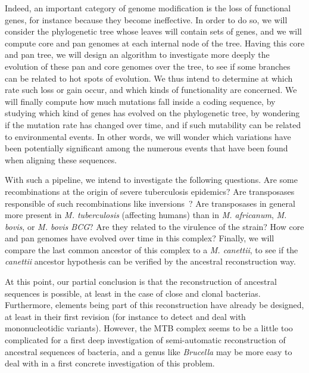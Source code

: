 \documentclass[runningheads,a4paper]{llncs}
\begin{document}
Indeed, an important category of genome modification is the loss of functional genes, for instance because they become ineffective. In order to do so, we will consider the phylogenetic tree whose leaves will contain sets of genes, and we will compute core and pan genomes at each internal node of the tree. Having this core and pan tree, we will design an algorithm to investigate more deeply the evolution of these pan and core genomes over the tree, to see if some branches can be related to hot spots of evolution. We thus intend to determine at which rate such loss or gain occur, and which kinds of functionality are concerned. 
We will finally compute how much mutations fall inside a coding sequence, by studying which kind of genes has evolved on the phylogenetic tree, by wondering if the mutation rate has changed over time, and if such mutability can be related to environmental events. In other words, we will wonder which variations have been potentially significant among the numerous events that have been found when aligning these sequences. 


With such a pipeline, we intend to investigate the following questions. Are some recombinations at the origin of severe tuberculosis epidemics? Are transposases responsible of such recombinations like inversions~\cite{siguier2006insertion,bergman2007discovering}? Are transposases in general more present in \textit{M. tuberculosis} (affecting humans) than in \textit{M.  africanum}, \textit{M. bovis}, or \textit{M. bovis BCG}? Are they related to the virulence of the strain? How core and pan genomes have evolved over time in this complex? Finally, we will compare the last common ancestor of this complex to a \textit{M. canettii}, to see if the \textit{canettii} ancestor hypothesis can be verified by the ancestral reconstruction way.




At this point, our partial conclusion is that the reconstruction of ancestral sequences is possible, at least in the case of close and clonal bacterias. Furthermore, elements being part of this reconstruction have already be designed, at least in their first revision (for instance to detect and deal with mononucleotidic variants). However, the MTB complex seems to be a little too complicated for a first deep investigation of semi-automatic reconstruction of ancestral sequences of bacteria, and a genus like \textit{Brucella} may be more easy to deal with in a first concrete investigation of this problem.
\end{document}
